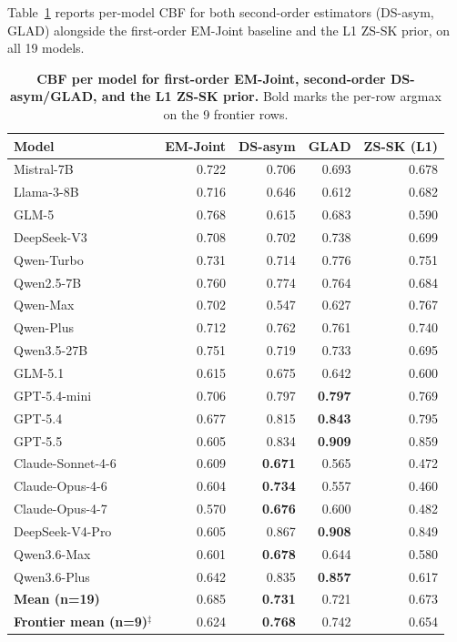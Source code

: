 \documentclass[11pt]{article}
\begin{document}
Table~\ref{tab:second_order_full} reports per-model CBF for both second-order estimators (DS-asym, GLAD) alongside the first-order EM-Joint baseline and the L1 ZS-SK prior, on all 19 models.
\begin{table}[h]
\centering
\small
\caption{\textbf{CBF per model for first-order EM-Joint, second-order DS-asym/GLAD, and the L1 ZS-SK prior.} Bold marks the per-row argmax on the 9 frontier rows.}
\label{tab:second_order_full}
\begin{tabular}{l rrrr}
\toprule
\textbf{Model} & \textbf{EM-Joint} & \textbf{DS-asym} & \textbf{GLAD} & \textbf{ZS-SK (L1)} \\
\midrule
Mistral-7B          & 0.722 & 0.706 & 0.693 & 0.678 \\
Llama-3-8B          & 0.716 & 0.646 & 0.612 & 0.682 \\
GLM-5               & 0.768 & 0.615 & 0.683 & 0.590 \\
DeepSeek-V3       & 0.708 & 0.702 & 0.738 & 0.699 \\
Qwen-Turbo          & 0.731 & 0.714 & 0.776 & 0.751 \\
Qwen2.5-7B          & 0.760 & 0.774 & 0.764 & 0.684 \\
Qwen-Max            & 0.702 & 0.547 & 0.627 & 0.767 \\
Qwen-Plus           & 0.712 & 0.762 & 0.761 & 0.740 \\
Qwen3.5-27B         & 0.751 & 0.719 & 0.733 & 0.695 \\
GLM-5.1             & 0.615 & 0.675 & 0.642 & 0.600 \\
\midrule
GPT-5.4-mini        & 0.706 & 0.797 & \textbf{0.797} & 0.769 \\
GPT-5.4             & 0.677 & 0.815 & \textbf{0.843} & 0.795 \\
GPT-5.5             & 0.605 & 0.834 & \textbf{0.909} & 0.859 \\
Claude-Sonnet-4-6   & 0.609 & \textbf{0.671} & 0.565 & 0.472 \\
Claude-Opus-4-6     & 0.604 & \textbf{0.734} & 0.557 & 0.460 \\
Claude-Opus-4-7     & 0.570 & \textbf{0.676} & 0.600 & 0.482 \\
DeepSeek-V4-Pro     & 0.605 & 0.867 & \textbf{0.908} & 0.849 \\
Qwen3.6-Max         & 0.601 & \textbf{0.678} & 0.644 & 0.580 \\
Qwen3.6-Plus        & 0.642 & 0.835 & \textbf{0.857} & 0.617 \\
\midrule
\textbf{Mean (n=19)} & 0.685 & \textbf{0.731} & 0.721 & 0.673 \\
\textbf{Frontier mean (n=9)$^\ddagger$} & 0.624 & \textbf{0.768} & 0.742 & 0.654 \\
\bottomrule
\end{tabular}
\end{table}
\end{document}
